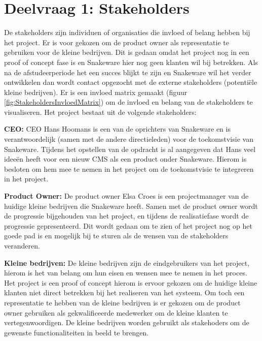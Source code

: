 \section{Deelvraag 1: Stakeholders}
\label{sec:Stakeholders}
De stakeholders zijn individuen of organisaties die invloed of belang hebben bij het project.
Er is voor gekozen om de product owner als representatie te gebruiken voor de kleine bedrijven.
Dit is gedaan omdat het project nog in een proof of concept fase is en Snakeware hier nog geen klanten wil bij betrekken.
Als na de afstudeerperiode het een succes blijkt te zijn en Snakeware wil het verder ontwikkelen dan wordt contact opgezocht met de externe stakeholders (potentiële kleine bedrijven).
Er is een invloed matrix gemaakt (figuur \ref{fig:StakeholdersInvloedMatrix}) om de invloed en belang van de stakeholders te visualiseren.
Het project bestaat uit de volgende stakeholders:

\whitespace
\textbf{CEO:}
CEO Hans Hoomans is een van de oprichters van Snakeware en is verantwoordelijk (samen met de andere directieleden) voor de toekomstvisie van Snakeware.
Tijdens het opstellen van de opdracht is al aangegeven dat Hans veel ideeën heeft voor een nieuw \gls{CMS} als een product onder Snakeware.
Hierom is besloten om hem mee te nemen in het project om de toekomstvisie te integreren in het project.

\whitespace
\textbf{Product Owner:}
De product owner Elsa Croes is een projectmanager van de huidige kleine bedrijven die Snakeware heeft.
Samen met de product owner wordt de progressie bijgehouden van het project, en tijdens de realisatiefase wordt de progressie gepresenteerd.
Dit wordt gedaan om te zien of het project nog op het goede pad is en mogelijk bij te sturen als de wensen van de stakeholders veranderen.

\whitespace
\textbf{Kleine bedrijven:}
De kleine bedrijven zijn de eindgebruikers van het project, hierom is het van belang om hun eisen en wensen mee te nemen in het proces.
Het project is een proof of concept hierom is ervoor gekozen om de huidige kleine klanten niet direct betrekken bij het realiseren van het systeem.
Om toch een representatie te hebben van de kleine bedrijven is er gekozen om de product owner gebruiken als gekwalificeerde medewerker om de kleine klanten te vertegenwoordigen.%
De kleine bedrijven worden gebruikt als stakehoders om de gewenste functionaliteiten in beeld te brengen.

